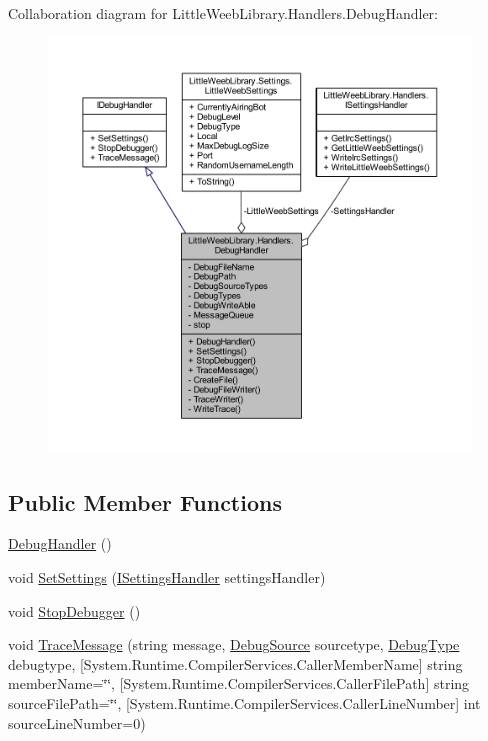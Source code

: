 Collaboration diagram for Little\+Weeb\+Library.\+Handlers.\+Debug\+Handler\+:\nopagebreak
\begin{figure}[H]
\begin{center}
\leavevmode
\includegraphics[width=350pt]{class_little_weeb_library_1_1_handlers_1_1_debug_handler__coll__graph}
\end{center}
\end{figure}
\subsection*{Public Member Functions}
\begin{DoxyCompactItemize}
\item 
\mbox{\hyperlink{class_little_weeb_library_1_1_handlers_1_1_debug_handler_a110c2f11a80b5dfa28545eca4a867a0b}{Debug\+Handler}} ()
\item 
void \mbox{\hyperlink{class_little_weeb_library_1_1_handlers_1_1_debug_handler_ac253016968e2d0141b49ab227a715242}{Set\+Settings}} (\mbox{\hyperlink{interface_little_weeb_library_1_1_handlers_1_1_i_settings_handler}{I\+Settings\+Handler}} settings\+Handler)
\item 
void \mbox{\hyperlink{class_little_weeb_library_1_1_handlers_1_1_debug_handler_aa02d002a4bdac52d769697d240866214}{Stop\+Debugger}} ()
\item 
void \mbox{\hyperlink{class_little_weeb_library_1_1_handlers_1_1_debug_handler_afccb37dfd6b2114af72000c2f4fe4607}{Trace\+Message}} (string message, \mbox{\hyperlink{namespace_little_weeb_library_1_1_handlers_a2a6ca0775121c9c503d58aa254d292be}{Debug\+Source}} sourcetype, \mbox{\hyperlink{namespace_little_weeb_library_1_1_handlers_ab66019ed40462876ec4e61bb3ccb0a62}{Debug\+Type}} debugtype, \mbox{[}System.\+Runtime.\+Compiler\+Services.\+Caller\+Member\+Name\mbox{]} string member\+Name=\char`\"{}\char`\"{}, \mbox{[}System.\+Runtime.\+Compiler\+Services.\+Caller\+File\+Path\mbox{]} string source\+File\+Path=\char`\"{}\char`\"{}, \mbox{[}System.\+Runtime.\+Compiler\+Services.\+Caller\+Line\+Number\mbox{]} int source\+Line\+Number=0)
\end{DoxyCompactItemize}

